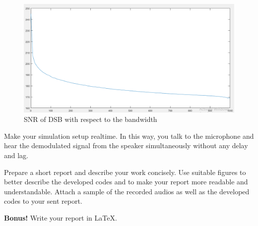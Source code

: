\documentclass[11pt]{article}
\begin{document}
\begin{question}
\begin{subquestion}
\begin{figure}[H]
\centering
\includegraphics[scale=0.6]{Fig/8.png}
\caption{SNR of DSB with respect to the bandwidth}
\end{figure}
\end{subquestion}

\begin{subquestion}{Make your simulation setup realtime. In this way, you talk to the microphone and hear the demodulated signal from the speaker simultaneously without any delay and lag. 
} 
\end{subquestion}

\begin{subquestion}{Prepare a short report and describe your work concisely. Use suitable figures to better describe the developed codes and to make your report more readable and understandable. Attach a sample of the recorded audios as well as the developed codes to your sent report. 
}
\end{subquestion}

\begin{subquestion}{\textbf{Bonus!} Write your report in \LaTeX.
} 
\end{subquestion}
\end{question}
\end{document}
